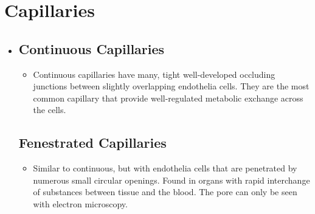 \section{Capillaries}
\begin{itemize}
  \item []
  
  \subsection{Continuous Capillaries}
  \begin{itemize}
    \item Continuous capillaries have many, tight well-developed occluding junctions between slightly overlapping endothelia cells. They are the most common capillary that provide well-regulated metabolic exchange across the cells.
 
    \begin{center}
    

      \bigskip

    \end{center}

    \begin{multicols}{3}
    \begin{center}
    \end{center}
    \end{multicols}
  \end{itemize}

  \newpage
  \subsection{Fenestrated Capillaries}
  \begin{itemize}
    \item Similar to continuous, but with endothelia cells that are penetrated by numerous small circular openings. Found in organs with rapid interchange of substances between tissue and the blood. The pore can only be seen with electron microscopy.
    
    
    \begin{center}



\end{center}
\end{itemize}
\end{itemize}
